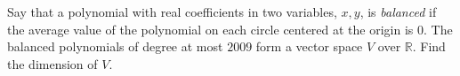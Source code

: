 Say that a polynomial with real coefficients in two variables, $x,y$, is \emph{balanced} if
the average value of the polynomial on each circle centered at the origin is $0$.
The balanced polynomials of degree at most $2009$ form a vector space $V$ over $\mathbb{R}$.
Find the dimension of $V$.
